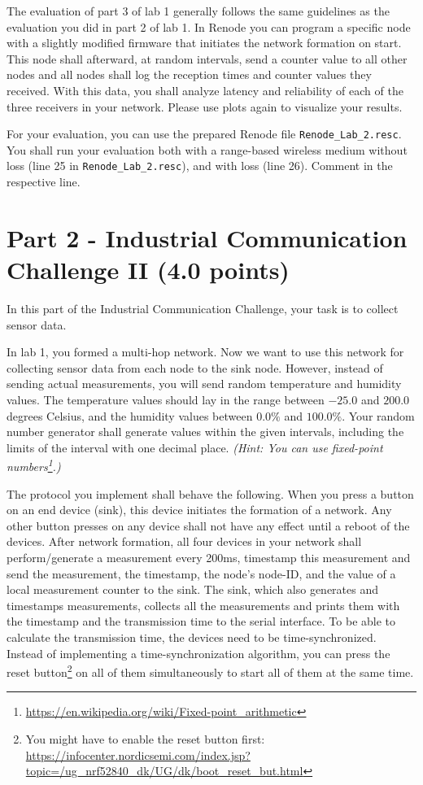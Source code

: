 \documentclass[11pt]{article}
\begin{document}
The evaluation of part 3 of lab 1 generally follows the same guidelines as the evaluation you did in part 2 of lab 1. In Renode you can program a specific node with a slightly modified firmware that initiates the network formation on start. This node shall afterward, at random intervals, send a counter value to all other nodes and all nodes shall log the reception times and counter values they received. With this data, you shall analyze latency and reliability of each of the three receivers in your network. Please use plots again to visualize your results.

For your evaluation, you can use the prepared Renode file \texttt{Renode\_Lab\_2.resc}. You shall run your evaluation both with a range-based wireless medium without loss (line 25 in \texttt{Renode\_Lab\_2.resc}), and with loss (line 26). Comment in the respective line.


\section*{Part 2 - Industrial Communication Challenge II (4.0 points)}

In this part of the Industrial Communication Challenge, your task is to collect sensor data.

In lab 1, you formed a multi-hop network. Now we want to use this network for collecting sensor data from each node to the sink node. However, instead of sending actual measurements, you will send random temperature and humidity values. The temperature values should lay in the range between $-25.0$ and $200.0$ degrees Celsius, and the humidity values between $0.0\%$ and $100.0\%$. Your random number generator shall generate values within the given intervals, including the limits of the interval with one decimal place. \textit{(Hint: You can use fixed-point numbers\footnote{\url{https://en.wikipedia.org/wiki/Fixed-point\_arithmetic}}.)}

The protocol you implement shall behave the following. When you press a button on an end device (sink), this device initiates the formation of a network. Any other button presses on any device shall not have any effect until a reboot of the devices. After network formation, all four devices in your network shall perform/generate a measurement every 200ms, timestamp this measurement and send the measurement, the timestamp, the node's node-ID, and the value of a local measurement counter to the sink.  The sink, which also generates and timestamps measurements, collects all the measurements and prints them with the timestamp and the transmission time to the serial interface. To be able to calculate the transmission time, the devices need to be time-synchronized. Instead of implementing a time-synchronization algorithm, you can press the reset button\footnote{You might have to enable the reset button first: \url{https://infocenter.nordicsemi.com/index.jsp?topic=/ug\_nrf52840\_dk/UG/dk/boot\_reset\_but.html}} on all of them simultaneously to start all of them at the same time.
\end{document}
